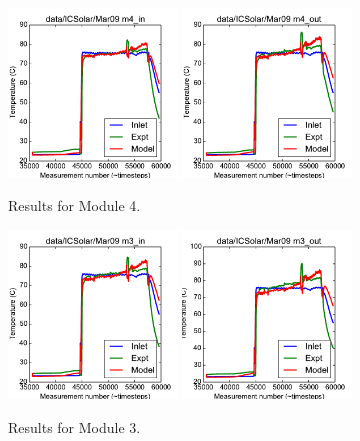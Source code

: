 \documentclass{article}
\begin{document}
\clearpage
\begin{figure}[!ht]
\centering
\includegraphics[width=0.4\textwidth]{../../data/ICSolar/images/Mar09_m4_in_unsteady.pdf}\hspace{0.05\textwidth}
\includegraphics[width=0.4\textwidth]{../../data/ICSolar/images/Mar09_m4_out_unsteady.pdf}\hspace{0.05\textwidth}\\
\caption{Results for Module 4.}\end{figure}
\begin{figure}[!ht]
\centering
\includegraphics[width=0.4\textwidth]{../../data/ICSolar/images/Mar09_m3_in_unsteady.pdf}\hspace{0.05\textwidth}
\includegraphics[width=0.4\textwidth]{../../data/ICSolar/images/Mar09_m3_out_unsteady.pdf}\hspace{0.05\textwidth}\\
\caption{Results for Module 3.}\end{figure}
\end{document}
